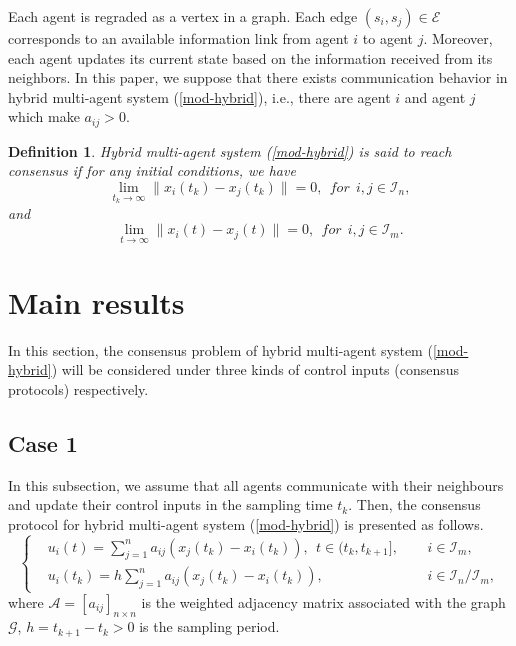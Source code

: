 \documentclass[12pt,draftcls,onecolumn]{IEEEtran}
\newtheorem{definition}{Definition}
\begin{document}
Each agent is regraded as a vertex in a graph. Each edge $(s_{i}, s_{j})\in \mathscr{E}$ corresponds to an available information link from agent $i$ to agent $j$. Moreover, each agent updates its current state based on the information received from its neighbors. In this paper, we suppose that there exists communication behavior in hybrid multi-agent system (\ref{mod-hybrid}), i.e.,  there are agent $i$ and agent $j$ which make $a_{ij}>0$.

\begin{definition}\label{def-consensus} Hybrid multi-agent system (\ref{mod-hybrid}) is said to reach consensus if for any initial conditions, we have
\begin{equation}\label{lim-tk-1}
\lim_{t_{k} \to \infty }\|x_{i}(t_{k})-x_{j}(t_{k})\|=0, ~~for~~i,j\in \mathcal{I}_{n},
\end{equation}
and
\begin{equation}\label{lim-t-1}
   \lim_{t \to \infty }\|x_{i}(t)-x_{j}(t)\|=0, ~~for~~i,j\in \mathcal{I}_{m}.
\end{equation}
\end{definition}



\section{Main results}\label{s-Main results}

In this section, the consensus problem of hybrid multi-agent system (\ref{mod-hybrid}) will be considered under three kinds of control inputs (consensus protocols) respectively.





\subsection{Case 1}\label{s-case1}
In this subsection, we assume that all agents communicate with their neighbours and update their control inputs in the sampling time $t_k$. Then, the consensus protocol for hybrid multi-agent system (\ref{mod-hybrid}) is presented as follows.
\begin{equation}\label{control-input-1}
\left\{
\begin{aligned}
&u_i(t)=\sum_{j=1}^na_{ij}(x_j(t_k)-x_i(t_k)),~~t\in (t_k,t_{k+1}],~~&&i\in \mathcal{I}_m,\\
&u_i(t_k)=h\sum_{j=1}^na_{ij}(x_j(t_k)-x_i(t_k)), &&i\in\mathcal{I}_{n}/\mathcal{I}_{m},
\end{aligned}
\right.
\end{equation}
where $\mathscr{A}=[a_{ij}]_{n\times n}$ is the weighted adjacency matrix
associated with the graph $\mathscr{G}$, $h=t_{k+1}-t_{k}>0$ is the sampling period.
\end{document}
